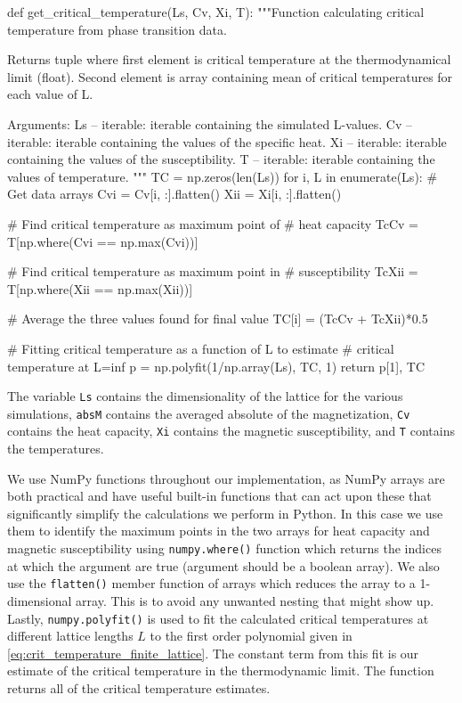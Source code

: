 \documentclass[reprint,english,notitlepage]{revtex4-1}  %
\begin{document}
\begin{python}
def get_critical_temperature(Ls, Cv, Xi, T):
    """Function calculating critical temperature from phase
    transition data.

    Returns tuple where first element is critical temperature at
    the thermodynamical limit (float). Second element is array
    containing mean of critical temperatures for each value of L.

    Arguments:
    Ls -- iterable: iterable containing the simulated L-values.
    Cv -- iterable: iterable containing the values of the specific
    				heat.
    Xi -- iterable: iterable containing the values of the
    				susceptibility.
    T -- iterable: iterable containing the values of
    			   temperature.
    """
    TC = np.zeros(len(Ls))
    for i, L in enumerate(Ls):
        # Get data arrays
        Cvi = Cv[i, :].flatten()
        Xii = Xi[i, :].flatten()

        # Find critical temperature as maximum point of
        # heat capacity
        TcCv = T[np.where(Cvi == np.max(Cvi))]

        # Find critical temperature as maximum point in
        # susceptibility
        TcXii = T[np.where(Xii == np.max(Xii))]

        # Average the three values found for final value
        TC[i] = (TcCv + TcXii)*0.5

    # Fitting critical temperature as a function of L to estimate
    # critical temperature at L=inf
    p = np.polyfit(1/np.array(Ls), TC, 1)
    return p[1], TC
\end{python} 

The variable \verb+Ls+ contains the dimensionality of the lattice for the various simulations, \verb+absM+ contains the averaged absolute of the magnetization, \verb+Cv+ contains the heat capacity, \verb+Xi+ contains the magnetic susceptibility, and \verb+T+ contains the temperatures. 

We use NumPy \citep{numpy} functions throughout our implementation, as NumPy arrays are both practical and have useful built-in functions that can act upon these that significantly simplify the calculations we perform in Python. In this case we use them to identify the maximum points in the two arrays for heat capacity and magnetic susceptibility using \verb+numpy.where()+ function which returns the indices at which the argument are true (argument should be a boolean array). We also use the \verb+flatten()+ member function of arrays which reduces the array to a 1-dimensional array. This is to avoid any unwanted nesting that might show up. Lastly, \verb+numpy.polyfit()+ is used to fit the calculated critical temperatures at different lattice lengths $L$ to the first order polynomial given in \eqref{eq:crit_temperature_finite_lattice}. The constant term from this fit is our estimate of the critical temperature in the thermodynamic limit. The function returns all of the critical temperature estimates.
\end{document}
